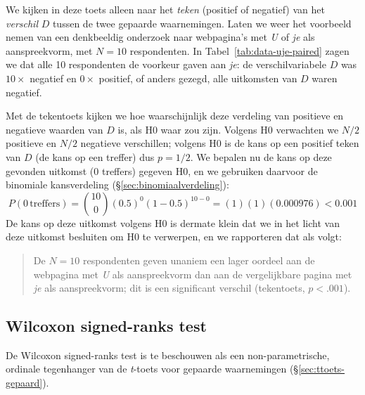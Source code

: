 \documentclass[
]{book}
\begin{document}
We kijken in deze toets alleen naar het \emph{teken} (positief of negatief)
van het \emph{verschil} \(D\) tussen de twee gepaarde waarnemingen. Laten we
weer het voorbeeld nemen van een denkbeeldig onderzoek naar webpagina's
met \emph{U} of \emph{je} als aanspreekvorm, met \(N=10\) respondenten. In
Tabel~\ref{tab:data-uje-paired} zagen we dat alle 10 respondenten de
voorkeur gaven aan \emph{je}: de verschilvariabele \(D\) was \(10\times\)
negatief en \(0\times\) positief, of anders gezegd, alle uitkomsten van
\(D\) waren negatief.

Met de tekentoets kijken we hoe waarschijnlijk deze verdeling van
positieve en negatieve waarden van \(D\) is, als H0 waar zou zijn. Volgens
H0 verwachten we \(N/2\) positieve en \(N/2\) negatieve verschillen; volgens
H0 is de kans op een positief teken van \(D\) (de kans op een treffer) dus
\(p=1/2\). We bepalen nu de kans op deze gevonden uitkomst (0 treffers)
gegeven H0, en we gebruiken daarvoor de binomiale kansverdeling
(§\ref{sec:binomiaalverdeling}):
\begin{equation}
  \label{eq:prob-binom-uje}
    P(0\,\mbox{treffers}) = {10 \choose 0} (0.5)^0 (1-0.5)^{10-0} = (1) (1) (0.000976) < 0.001
\end{equation}
De kans op deze uitkomst volgens H0 is dermate klein dat we in het licht
van deze uitkomst besluiten om H0 te verwerpen, en we rapporteren dat
als volgt:

\begin{quote}
De \(N=10\) respondenten geven unaniem een lager oordeel aan de
webpagina met \emph{U} als aanspreekvorm dan aan de vergelijkbare pagina
met \emph{je} als aanspreekvorm; dit is een significant verschil
(tekentoets, \(p<.001\)).
\end{quote}

\hypertarget{sec:Wilcoxon-signed-rank}{%
\subsection{Wilcoxon signed-ranks test}\label{sec:Wilcoxon-signed-rank}}

De Wilcoxon signed-ranks test is te beschouwen als een
non-parametrische, ordinale tegenhanger van de \emph{t}-toets voor gepaarde
waarnemingen (§\ref{sec:ttoets-gepaard}).
\end{document}
